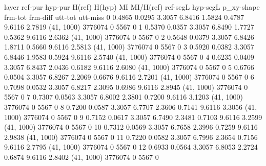 layer     ref-pur    hyp-pur    H(ref)    H(hyp)      MI    MI/H(ref)    ref-segL    hyp-segL  p_xy-shape      frm-tot    frm-diff    utt-tot    utt-miss
0          0.4865     0.0295    3.3057    6.8416  1.5824       0.4787      9.6116      2.7819  (41, 1000)      3776074           0       5567           0
1          0.5370     0.0357    3.3057    6.8490  1.7727       0.5362      9.6116      2.6362  (41, 1000)      3776074           0       5567           0
2          0.5648     0.0379    3.3057    6.8426  1.8711       0.5660      9.6116      2.5813  (41, 1000)      3776074           0       5567           0
3          0.5920     0.0382    3.3057    6.8446  1.9583       0.5924      9.6116      2.5740  (41, 1000)      3776074           0       5567           0
4          0.6235     0.0409    3.3057    6.8437  2.0436       0.6182      9.6116      2.6080  (41, 1000)      3776074           0       5567           0
5          0.6766     0.0504    3.3057    6.8267  2.2069       0.6676      9.6116      2.7201  (41, 1000)      3776074           0       5567           0
6          0.7098     0.0532    3.3057    6.8217  2.3095       0.6986      9.6116      2.8945  (41, 1000)      3776074           0       5567           0
7          0.7307     0.0563    3.3057    6.8002  2.3801       0.7200      9.6116      3.1203  (41, 1000)      3776074           0       5567           0
8          0.7200     0.0587    3.3057    6.7707  2.3606       0.7141      9.6116      3.3056  (41, 1000)      3776074           0       5567           0
9          0.7152     0.0617    3.3057    6.7490  2.3481       0.7103      9.6116      3.2599  (41, 1000)      3776074           0       5567           0
10         0.7312     0.0569    3.3057    6.7658  2.3996       0.7259      9.6116      2.9838  (41, 1000)      3776074           0       5567           0
11         0.7220     0.0582    3.3057    6.7996  2.3654       0.7156      9.6116      2.7795  (41, 1000)      3776074           0       5567           0
12         0.6933     0.0564    3.3057    6.8053  2.2724       0.6874      9.6116      2.8402  (41, 1000)      3776074           0       5567           0